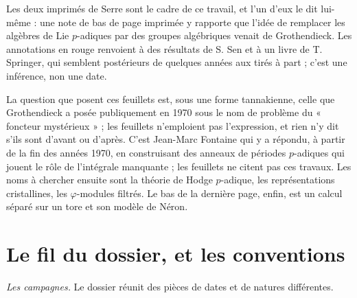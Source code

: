 \documentclass[11pt,a4paper]{article}
\begin{document}
\begin{resume}
Les deux imprimés de Serre sont le cadre de ce travail, et l'un d'eux le dit
lui-même : une note de bas de page imprimée y rapporte que l'idée de remplacer
les algèbres de Lie $p$-adiques par des groupes algébriques venait de
Grothendieck. Les annotations en rouge renvoient à des résultats de S. Sen et
à un livre de T. Springer, qui semblent postérieurs de quelques années aux
tirés à part ; c'est une inférence, non une date.

La question que posent ces feuillets est, sous une forme tannakienne, celle
que Grothendieck a posée publiquement en 1970 sous le nom de problème du
« foncteur mystérieux » ; les feuillets n'emploient pas l'expression, et rien
n'y dit s'ils sont d'avant ou d'après. C'est Jean-Marc Fontaine qui y a
répondu, à partir de la fin des années 1970, en construisant des anneaux de
périodes $p$-adiques qui jouent le rôle de l'intégrale manquante ; les
feuillets ne citent pas ces travaux. Les noms à
chercher ensuite sont la théorie de Hodge $p$-adique, les représentations
cristallines, les $\varphi$-modules filtrés. Le bas de la dernière page, enfin,
est un calcul séparé sur un tore et son modèle de Néron.

\end{resume}

\section*{Le fil du dossier, et les conventions}

\emph{Les campagnes.} Le dossier réunit des pièces de dates et de natures
différentes.
\end{document}
